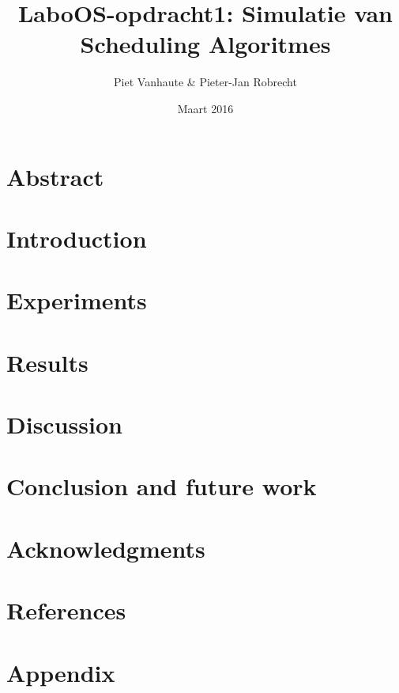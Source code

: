 \documentclass{article}
\title{LaboOS-opdracht1: Simulatie van Scheduling Algoritmes}
\author{Piet Vanhaute \& \mbox{Pieter-Jan} Robrecht}
\date{Maart 2016}
\begin{document}


\clearpage
\setcounter{page}{1}

\tableofcontents
\clearpage

\section{Abstract}
\section{Introduction}
\section{Experiments}
\section{Results}
\section{Discussion}
\section{Conclusion and future work}
\section{Acknowledgments}
\section{References}
\section{Appendix}
\end{document}

